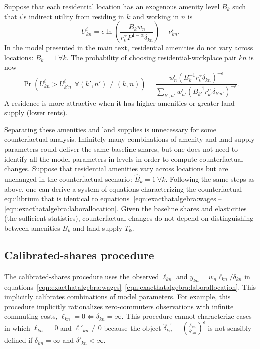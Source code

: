 \documentclass[11pt]{article}
\theoremstyle{definition}
\begin{document}
Suppose that each residential location has an exogenous amenity level $B_k$ such that 
$i$'s indirect utility from residing in $k$ and working in $n$ is
\begin{equation*}
U_{kn}^{i} = \epsilon \ln\left(\frac{B_k w_n}{r_k^\alpha P^{1-\alpha} \delta_{kn}}\right) + \nu_{kn}^{i}
.
\end{equation*}
In the model presented in the main text,
residential amenities do not vary across locations: 
$B_{k} = 1 \ \forall k$.
The probability of choosing residential-workplace pair $kn$ is now
\begin{equation*}
	\Pr(U_{kn}^{i} > U_{k'n'}^{i} \ \forall (k',n') \neq (k,n)) 
	=
	\frac
	{w_{n}^\epsilon \left(B_{k}^{-1}r_{k}^\alpha  \delta_{kn}\right)^{-\epsilon}}
	{\sum_{k',n'} w_{n'}^\epsilon \left(B_{k'}^{-1}r_{k'}^\alpha  \delta_{k'n'}\right)^{-\epsilon}}
	.
\end{equation*}
A residence is more attractive when it has higher amenities or greater land supply (lower rents).

Separating these amenities and land supplies is unnecessary for some counterfactual analysis.
Infinitely many combinations of amenity and land-supply parameters could deliver the same baseline shares,
but one does not need to identify all the model parameters in levels in order to compute counterfactual changes.
Suppose that residential amenities vary across locations but are unchanged in the counterfactual scenario:
$\hat{B}_{k} = 1 \ \forall k$.
Following the same steps as above,
one can derive a system of equations characterizing the counterfactual equilibrium
that is identical to equations~\eqref{eqn:exacthatalgebra:wages}--\eqref{eqn:exacthatalgebra:laborallocation}.
Given the baseline shares and elasticities (the sufficient statistics),
counterfactual changes do not depend on distinguishing between amenities $B_k$ and land supply $T_k$.

\subsection{Calibrated-shares procedure}\label{sec:appendix:theory:calibratedshares}

The calibrated-shares procedure uses the observed $\ell_{kn}$ and $y_{kn} = w_n \ell_{kn} / \bar{\delta}_{kn}$ in equations~\eqref{eqn:exacthatalgebra:wages}--\eqref{eqn:exacthatalgebra:laborallocation}.
This implicitly calibrates combinations of model parameters.
For example,
this procedure implicitly rationalizes zero-commuters observations with infinite commuting costs, $\ell_{kn}=0 \iff \delta_{kn} = \infty$.
This procedure cannot characterize cases in which $\ell_{kn}=0$ and $\ell'_{kn} \neq 0$
because the object $\hat{\delta}_{kn}^{-\epsilon} = \left(\frac{\delta_{kn}}{\delta'_{kn}}\right)^{\epsilon}$ is not sensibly defined if $\delta_{kn} = \infty$ and $\delta'_{kn} < \infty$.
\end{document}
